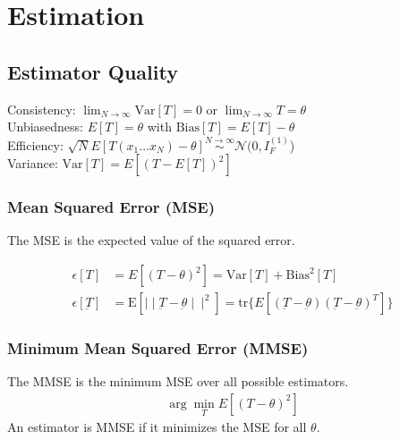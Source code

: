 \section{Estimation}
\begin{mdframed}[style=eqbox]
  \subsection{Estimator Quality}
  Consistency: $\lim_{N \to \infty} \text{Var} \left[ T \right] = 0$ or $\lim_{N \to \infty} T = \theta$\\
  Unbiasedness: $E[T] = \theta$ with $\text{Bias}[T] = E[T] - \theta$\\
  Efficiency: $\sqrt{N} E[T(x_1 \ldots x_N)-\theta]\overset{N \to \infty}{\sim} \mathcal{N}(0,I^{(1)}_F$)\\
  Variance: $\text{Var}[T] = E[(T - E[T])^2]$
  \subsubsection{Mean Squared Error (MSE)}
  The MSE is the expected value of the squared error.
  \begin{mdframed}[style=redbox]
    \vspace*{-10pt}
    \begin{align*}
      \epsilon[T] &= E[(T - \theta)^2] = \text{Var}[T] + \text{Bias}^2[T]\\
      \epsilon[\underbar{T}] &= \text{E}[\mid\mid \underbar{T} - \underbar{\theta} \mid\mid^2] = \text{tr}\{E[(\underbar{T} - \underbar{\theta})(\underbar{T} - \underbar{\theta})^T]\}
    \end{align*}
  \end{mdframed}
  \subsubsection{Minimum Mean Squared Error (MMSE)}
  The MMSE is the minimum MSE over all possible estimators.
  \begin{align*}
    \arg \min_T E[(T - \theta)^2]
  \end{align*}
  An estimator is MMSE if it minimizes the MSE for all $\theta$.
\end{mdframed}
